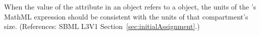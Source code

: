 When the value of the attribute  in an \InitialAssignment
object refers to a \Compartment object, the units of the
\InitialAssignment's MathML  expression should be consistent
with the units of that compartment's size.  (References: SBML L3V1
Section~\ref{sec:initialAssignment}.)
